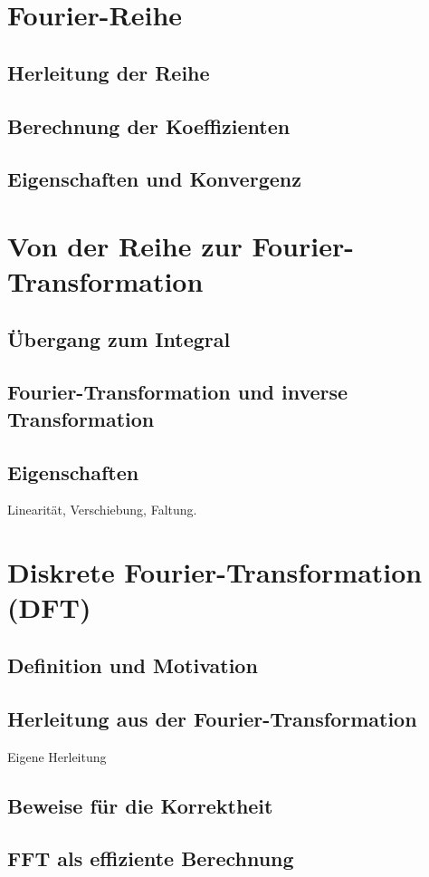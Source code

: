 \documentclass[a4paper,12pt]{article}
\theoremstyle{definition}
\theoremstyle{remark}
\begin{document}
\section{Fourier-Reihe}
\subsection{Herleitung der Reihe}
\subsection{Berechnung der Koeffizienten}
\subsection{Eigenschaften und Konvergenz}

\section{Von der Reihe zur Fourier-Transformation}
\subsection{Übergang zum Integral}
\subsection{Fourier-Transformation und inverse Transformation}
\subsection{Eigenschaften}
Linearität, Verschiebung, Faltung.

\section{Diskrete Fourier-Transformation (DFT)}
\subsection{Definition und Motivation}
\subsection{Herleitung aus der Fourier-Transformation}
Eigene Herleitung
\subsection{Beweise für die Korrektheit}
\subsection{FFT als effiziente Berechnung}
\end{document}
